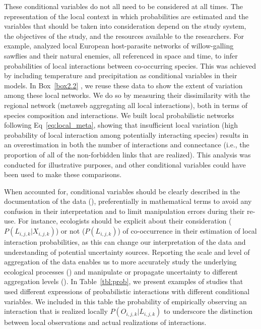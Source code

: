 These conditional variables do not all need to be considered at all times. The
representation of the local context in which probabilities are estimated and the
variables that should be taken into consideration depend on the study system,
the objectives of the study, and the resources available to the researchers. For
example, \cite{Gravel2019Bringing} analyzed local European host-parasite
networks of willow-galling sawflies and their natural enemies, all referenced in
space and time, to infer probabilities of local interactions between
co-occurring species. This was achieved by including temperature and
precipitation as conditional variables in their models. In Box~\ref{box2.2} , we
reuse these data to show the extent of variation among these local networks. We
do so by measuring their dissimilarity with the regional network (metaweb
aggregating all local interactions), both in terms of species composition and
interactions. We built local probabilistic networks following
Eq~\ref{eq:local_meta}, showing that insufficient local variation (high
probability of local interaction among potentially interacting species) results
in an overestimation in both the number of interactions and connectance (i.e.,
the proportion of all of the non-forbidden links that are realized). This
analysis was conducted for illustrative purposes, and other conditional
variables could have been used to make these comparisons.

When accounted for, conditional variables should be clearly described in the
documentation of the data (\cite{Brimacombe2023Shortcomings}), preferentially in
mathematical terms to avoid any confusion in their interpretation and to limit
manipulation errors during their re-use. For instance, ecologists should be
explicit about their consideration  ($P(L_{i, j, k} | X_{i,j,k})$) or not
($P(L_{i, j, k})$) of co-occurrence in their estimation of local interaction
probabilities, as this can change our interpretation of the data and
understanding of potential uncertainty sources. Reporting the scale and level of
aggregation of the data enables us to more accurately study the underlying
ecological processes (\cite{Clark2011Individualscale}) and manipulate or
propagate uncertainty to different aggregation levels
(\cite{Simmonds2024Recommendations}). In Table~\ref{tbl:prob}, we present examples of
studies that used different expressions of probabilistic interactions with
different conditional variables. We included in this table the probability of
empirically observing an interaction that is realized locally $P(O_{i, j, k}
\vert L_{i, j, k})$ to underscore the distinction between local observations and
actual realizations of interactions.

